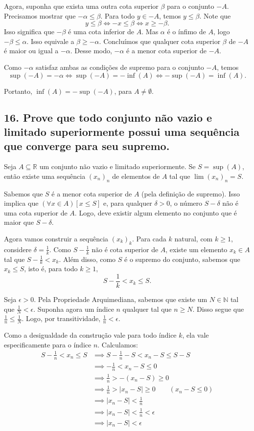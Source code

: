 \documentclass[12pt]{article}
\begin{document}
	Agora, suponha que exista uma outra cota superior $\beta$ para o conjunto $-A$. Precisamos mostrar que $-\alpha \leq \beta$. Para todo $y \in -A$, temos $y \leq \beta$. Note que
	\[
	y \leq \beta \iff -x \leq \beta \iff x \geq -\beta.
	\]
	Isso significa que $-\beta$ é uma cota inferior de $A$. Mas $\alpha$ é o ínfimo de $A$, logo $-\beta \leq \alpha$. Isso equivale a $\beta \geq -\alpha$. Concluímos que qualquer cota superior $\beta$ de $-A$ é maior ou igual a $-\alpha$. Desse modo, $-\alpha$ é a menor cota superior de $-A$.
	
	Como $-\alpha$ satisfaz ambas as condições de supremo para o conjunto $-A$, temos
	\[
	\sup(-A) = -\alpha \iff \sup(-A) = -\inf(A) \iff -\sup(-A) = \inf(A).
	\]
	
	Portanto, $\inf(A) = -\sup(-A)$, para $A \neq \emptyset$. \blacksquare
	
	\subsection*{16. Prove que todo conjunto não vazio e limitado superiormente possui uma sequência que converge para seu supremo.}
	
	Seja $A \subseteq \mathbb{R}$ um conjunto não vazio e limitado superiormente. Se $S = \sup(A)$, então existe uma sequência $(x_n)_n$ de elementos de $A$ tal que $\lim(x_n)_n = S$.
	
	Sabemos que $S$ é a menor cota superior de $A$ (pela definição de supremo). Isso implica que $(\forall x \in A)[x \leq S]$ e, para qualquer $\delta > 0$, o número $S - \delta$ não é uma cota superior de $A$. Logo, deve existir algum elemento no conjunto que é maior que $S - \delta$.
	
	Agora vamos construir a sequência $(x_k)_k$. Para cada $k$ natural, com $k \geq 1$, considere $\delta = \frac{1}{k}$. Como $S - \frac{1}{k}$ não é cota superior de $A$, existe um elemento $x_k \in A$ tal que $S - \frac{1}{k} < x_k$. Além disso, como $S$ é o supremo do conjunto, sabemos que $x_k \leq S$, isto é, para todo $k \geq 1$,
	\[
	S - \frac{1}{k} < x_k \leq S.
	\]
	
	Seja $\epsilon > 0$. Pela Propriedade Arquimediana, sabemos que existe um $N \in \mathbb{N}$ tal que $\frac{1}{N} < \epsilon$. Suponha agora um índice $n$ qualquer tal que $n \geq N$. Disso segue que $\frac{1}{n} \leq \frac{1}{N}$. Logo, por transitividade, $\frac{1}{n} < \epsilon$.
	
	Como a desigualdade da construção vale para todo índice $k$, ela vale especificamente para o índice $n$. Calculamos:
	\begin{align*}
		S - \frac{1}{n} < x_n \leq S
		&\implies S - \frac{1}{n} - S < x_n - S \leq S - S \\
		&\implies -\frac{1}{n} < x_n - S \leq 0 \\
		&\implies \frac{1}{n} > -(x_n - S) \geq 0 \\
		&\implies \frac{1}{n} > |x_n - S| \geq 0 \qquad (x_n - S \leq 0) \\
		&\implies |x_n - S| < \frac{1}{n} \\
		&\implies |x_n - S| < \frac{1}{n} < \epsilon \\
		&\implies |x_n - S| < \epsilon
	\end{align*}
	
\end{document}
